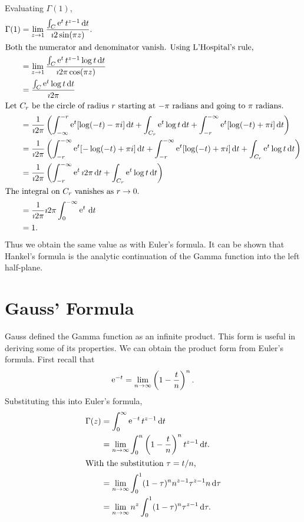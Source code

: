 Evaluating $\Gamma(1)$,
\begin{align*}
  \Gamma(1)
  &= \lim_{z \to 1} \frac{\int_C \mathop{\mathrm{e}}\nolimits^t t^{z-1}\,\mathrm{d} t}{\imath 2 \sin(\pi z)}. \\
  \intertext{Both the numerator and denominator vanish.  Using L'Hospital's 
    rule,}
  &= \lim_{z \to 1} \frac{\int_C \mathop{\mathrm{e}}\nolimits^t t^{z-1} \log t \,\mathrm{d} t}
  {\imath 2 \pi \cos(\pi z)} \\
  &= \frac{\int_C \mathop{\mathrm{e}}\nolimits^t \log t \,\mathrm{d} t}{\imath 2 \pi} \\
  \intertext{Let $C_r$ be the circle of radius $r$ starting at $-\pi$ radians 
    and going to $\pi$ radians.}
  &= \frac{1}{\imath 2 \pi} \left( \int_{-\infty}^{-r}\mathop{\mathrm{e}}\nolimits^t[\log(-t)-\pi i]\,\mathrm{d} t
    + \int_{C_r} \mathop{\mathrm{e}}\nolimits^t \log t \,\mathrm{d} t
    + \int_{-r}^{-\infty} \mathop{\mathrm{e}}\nolimits^t [\log (-t) + \pi i]\,\mathrm{d} t \right) \\
  &= \frac{1}{\imath 2 \pi} \left( \int_{-r}^{-\infty}\mathop{\mathrm{e}}\nolimits^t[-\log(-t)+\pi i]\,\mathrm{d} t
    + \int_{-r}^{-\infty} \mathop{\mathrm{e}}\nolimits^t [\log(-t) + \pi i] \,\mathrm{d} t
    + \int_{C_r} \mathop{\mathrm{e}}\nolimits^t \log t \,\mathrm{d} t \right) \\
  &= \frac{1}{\imath 2 \pi} \left( \int_{-r}^{-\infty} \mathop{\mathrm{e}}\nolimits^t \imath 2 \pi \,\mathrm{d} t
    + \int_{C_r} \mathop{\mathrm{e}}\nolimits^t \log t \,\mathrm{d} t \right) \\
  \intertext{The integral on $C_r$ vanishes as $r \to 0$.}
  &= \frac{1}{\imath 2 \pi} \imath 2 \pi \int_0^{-\infty} \mathop{\mathrm{e}}\nolimits^t \,\mathrm{d} t \\
  &= 1.
\end{align*}
Thus we obtain the same value as with Euler's formula.  It can be shown that
Hankel's formula
is the analytic continuation of the Gamma function into the left half-plane.















\section{Gauss' Formula}

Gauss defined the Gamma function as an infinite product.  This form is useful
in deriving some of its properties.  We can obtain the product form from
Euler's formula.  First recall that
\[ \mathop{\mathrm{e}}\nolimits^{-t} = \lim_{n \to \infty} \left(1 - \frac{t}{n} \right)^n. \]
Substituting this into Euler's formula,
\begin{align*}
  \Gamma(z) 
  &= \int_0^\infty\mathop{\mathrm{e}}\nolimits^{-t} t^{z-1}\,\mathrm{d} t \\
  &= \lim_{n \to \infty} \int_0^n \left(1 - \frac{t}{n}\right)^n
  t^{z-1} \,\mathrm{d} t. \\
  \intertext{With the substitution $\tau = t/n$,}
  &= \lim_{n \to \infty} \int_0^1 (1-\tau)^n n^{z-1} \tau^{z-1} n
  \,\mathrm{d} \tau \\
  &= \lim_{n \to \infty} n^z \int_0^1 (1-\tau)^n \tau^{z-1}\,\mathrm{d} \tau.
\end{align*}

